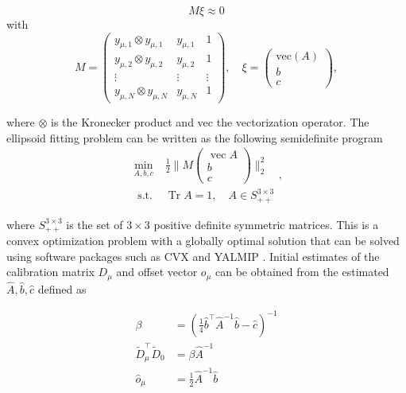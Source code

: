 \begin{equation}
	M \xi \approx 0
\end{equation}
with
\begin{equation}
	M=\left(\begin{array}{ccc}
		y_{\mu, 1} \otimes y_{\mu, 1} & y_{\mu, 1} & 1 \\
		y_{\mu, 2} \otimes y_{\mu, 2} & y_{\mu, 2} & 1 \\
		\vdots & \vdots & \vdots \\
		y_{\mu, N} \otimes y_{\mu, N} & y_{\mu, N} & 1
	\end{array}\right), \quad \xi=\left(\begin{array}{c}
		\mathrm{vec} (A) \\
		b \\
		c
	\end{array}\right),
\end{equation}

where $\otimes$ is the Kronecker product and vec the vectorization operator.
The ellipsoid fitting problem can be written as the following semidefinite program \cite{Kok2016} 
\begin{equation}
	\begin{array}{ll}
		\min _{A, b, c} & \frac{1}{2}\|M\left(\begin{array}{c}
			\operatorname{vec} A \\
			b \\
			c
		\end{array}\right)\|_{2}^{2} \\
		\text { s.t. } & \operatorname{Tr} A=1, \quad A \in S_{++}^{3 \times 3}
	\end{array},
\end{equation}

where $S_{++}^{3 \times 3}$ is the set of $3 \times 3$ positive definite symmetric matrices. This is a convex optimization problem with a globally optimal solution that can be solved using software packages such as CVX \cite{cvx} and YALMIP \cite{Lofberg2004}. Initial estimates of the calibration matrix $D_\mu$ and offset vector $o_\mu$ can be obtained from the estimated $\widehat{A}, \widehat{b}, \widehat{c}$ defined as

\begin{subequations}
	\begin{align}
		\beta &=\left(\frac{1}{4} \hat{b}^{\top} \widehat{A}^{-1} \widehat{b}-\widehat{c}\right)^{-1} \\
		\widetilde{D}_{\mu}^{\top} \widetilde{D}_{0} &=\beta \widehat{A}^{-1} \\
		\widehat{o}_{\mu} &=\frac{1}{2} \widehat{A}^{-1} \widehat{b}
	\end{align}
\end{subequations}

